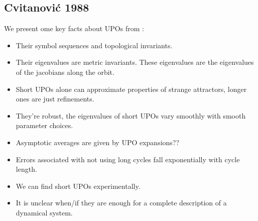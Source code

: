 \subsection{Cvitanović 1988}

We present ome key facts about UPOs from \cite{Cvitanovic1988}:

\begin{itemize}
    \item Their symbol sequences and topological invariants.
    \item Their eigenvalues are metric invariants. These eigenvalues are the eigenvalues of the jacobians along the orbit.
    \item Short UPOs alone can approximate properties of strange attractors, longer ones are just refinements.
    \item They're robust, the eigenvalues of short UPOs vary smoothly with smooth parameter choices.
    \item Asymptotic averages are given by UPO expansions??
    \item Errors associated with not using long cycles fall exponentially with cycle length.
    \item We can find short UPOs experimentally.
    \item It is unclear when/if they are enough for a complete description of a dynamical system.
\end{itemize}
